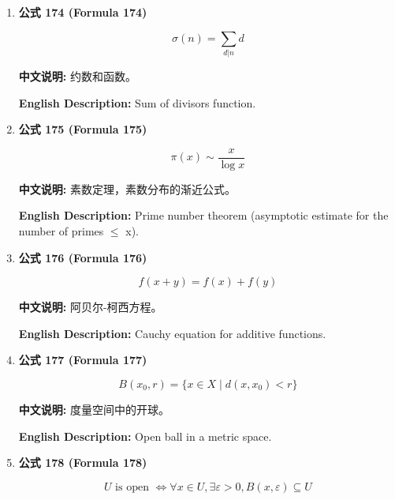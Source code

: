 \documentclass[12pt,a4paper]{article}
\begin{document}
\begin{enumerate}[leftmargin=*]
\vspace{0.5cm}

\item \textbf{公式 174 (Formula 174)}

\begin{equation}
\sigma(n) = \sum_{d|n} d
\end{equation}

\textbf{中文说明:} 约数和函数。

\textbf{English Description:} Sum of divisors function.

\vspace{0.5cm}

\item \textbf{公式 175 (Formula 175)}

\begin{equation}
\pi(x) \sim \frac{x}{\log x}
\end{equation}

\textbf{中文说明:} 素数定理，素数分布的渐近公式。

\textbf{English Description:} Prime number theorem (asymptotic estimate for the number of primes $\leq$ x).

\vspace{0.5cm}

\item \textbf{公式 176 (Formula 176)}

\begin{equation}
f(x+y) = f(x) + f(y)
\end{equation}

\textbf{中文说明:} 阿贝尔-柯西方程。

\textbf{English Description:} Cauchy equation for additive functions.

\vspace{0.5cm}

\item \textbf{公式 177 (Formula 177)}

\begin{equation}
B(x_0, r) = \{ x \in X \mid d(x, x_0) < r \}
\end{equation}

\textbf{中文说明:} 度量空间中的开球。

\textbf{English Description:} Open ball in a metric space.

\vspace{0.5cm}

\item \textbf{公式 178 (Formula 178)}

\begin{equation}
U \text{ is open } \iff \forall x \in U, \exists \varepsilon > 0, B(x, \varepsilon) \subseteq U
\end{equation}


\end{enumerate}
\end{document}
